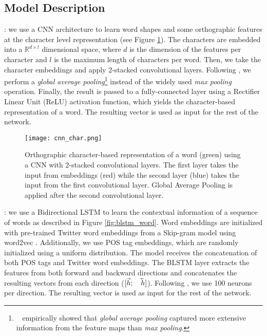 \documentclass[11pt,letterpaper]{article}
\newcommand{\cev}[1]
{\reflectbox{\ensuremath{\vec{\reflectbox{\ensuremath{#1}}}}}}
\begin{document}
\subsection{Model Description} \label{model}

: we use a CNN architecture to learn word shapes and some orthographic features at the character level representation (see Figure \ref{fig:cnn_char}). The characters are embedded into a $\mathbb{R}^{d \times l}$ dimensional space, where $d$ is the dimension of the features per character and $l$ is the maximum length of characters per word. Then, we take the character embeddings and apply 2-stacked convolutional layers. Following \citet{DBLP:journals/corr/ZhouKLOT15}, we perform a \textit{global average pooling}\footnote{~\citet{DBLP:journals/corr/ZhouKLOT15} empirically showed that \textit{global average pooling} captured more extensive information from the feature maps than \textit{max pooling}.} instead of the widely used \textit{max pooling} operation. Finally, the result is passed to a fully-connected layer using a Rectifier Linear Unit (ReLU) activation function, which yields the character-based representation of a word. The resulting vector is used as input for the rest of the network.

\begin{figure}
\centering
\texttt{[image: cnn\_char.png]}
\caption{ \small Orthographic character-based representation of a word (green) using a CNN with 2-stacked convolutional layers. The first layer takes the input from embeddings (red) while the second layer (blue) takes the input from the first convolutional layer. Global Average Pooling is applied after the second convolutional layer.}
\label{fig:cnn_char}
\end{figure}

: we use a Bidirectional LSTM \cite{DBLP:journals/corr/DyerBLMS15} to learn the contextual information of a sequence of words as described in Figure \ref{fig:blstm_word}. Word embeddings are initialized with pre-trained Twitter word embeddings from a Skip-gram model \cite{godin2015multimedia} using word2vec \cite{mikolov2013word2vec}. Additionally, we use POS tag embeddings, which are randomly initialized using a uniform distribution. The model receives the concatenation of both POS tags and Twitter word embeddings. The BLSTM layer extracts the features from both forward and backward directions and concatenates the resulting vectors from each direction ($[\vec{h};\quad\cev{h}]$). Following \citet{DBLP:journals/corr/MaH16}, we use 100 neurons per direction. The resulting vector is used as input for the rest of the network.
\end{document}
